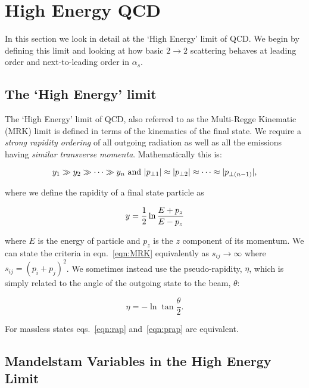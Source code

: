 \chapter{High Energy QCD}
\label{chap:HEQCD}

	In this section we look in detail at the `High Energy' limit of QCD.  We begin by defining this limit and
	looking at how basic $2\rightarrow2$ scattering behaves at leading order and next-to-leading order in
	$\alpha_s$.

	\section{The `High Energy' limit}
		\label{sub:HElimit}

		The `High Energy' limit of QCD, also referred to as the Multi-Regge Kinematic (MRK) limit is
		defined in terms of the kinematics of the final state.  We require a \emph{strong rapidity ordering}
		of all outgoing radiation as well as all the emissions having \emph{similar transverse momenta}.
		Mathematically this is:

		\begin{equation}
			y_1\gg y_2\gg\cdots\gg\\y_n \text{ and } |p_{\perp1}| \approx |p_{\perp2}| \approx\cdots\approx|p_{\perp(n-1)}|,
			\label{eqn:MRK}
		\end{equation}

  		where we define the rapidity of a final state particle as

		\begin{equation}
			y = \frac{1}{2}\ln\frac{E+p_z}{E-p_z}
			\label{eqn:rap}
		\end{equation}

		where $E$ is the energy of particle and $p_z$ is the $z$ component of its momentum. We can
		state the criteria in eqn.~\eqref{eqn:MRK} equivalently as $s_{ij}\rightarrow\infty$ where
		$s_{ij} = (p_i + p_j)^2$.  We sometimes instead use the pseudo-rapidity, $\eta$, which is
		simply related to the angle of the outgoing state to the beam, $\theta$:

		\begin{equation}
			\eta = -\ln\tan\frac{\theta}{2}.
			\label{eqn:prap}
		\end{equation}

		For massless states eqs.~\eqref{eqn:rap} and~\eqref{eqn:prap} are equivalent.

	\section{Mandelstam Variables in the High Energy Limit}
		\label{sub:MandelstamVariables}

